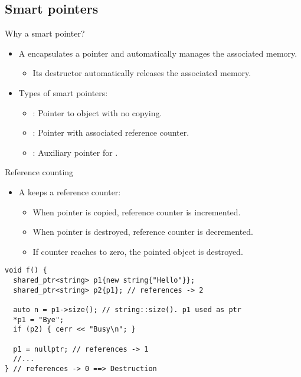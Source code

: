 \subsection{Smart pointers}

\begin{frame}[t]{Why a smart pointer?}
\begin{itemize}
  \item A  encapsulates a pointer and 
        automatically manages the associated memory.
    \begin{itemize}
      \item Its destructor automatically releases the associated memory.
    \end{itemize}

  \vfill\pause
  \item Types of smart pointers:
    \begin{itemize}
      \item {}: Pointer to object with no copying.
      \item {}: Pointer with associated reference counter.
      \item {}: Auxiliary pointer for .
    \end{itemize}
\end{itemize}
\end{frame}


\begin{frame}[t,fragile]{Reference counting}
\begin{itemize}
  \item A  keeps a reference counter:
    \begin{itemize}
      \item When pointer is copied, reference counter is incremented.
      \item When pointer is destroyed, reference counter is decremented.
      \item If counter reaches to zero, the pointed object is destroyed.
    \end{itemize}
\end{itemize}

\begin{lstlisting}
void f() {
  shared_ptr<string> p1{new string{"Hello"}};
  shared_ptr<string> p2{p1}; // references -> 2

  auto n = p1->size(); // string::size(). p1 used as ptr
  *p1 = "Bye";
  if (p2) { cerr << "Busy\n"; }

  p1 = nullptr; // references -> 1
  //...
} // references -> 0 ==> Destruction
\end{lstlisting}

\end{frame}



